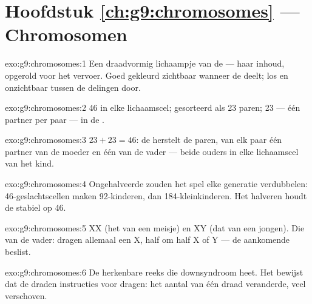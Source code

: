 \section*{Hoofdstuk \ref{ch:g9:chromosomes} --- Chromosomen}

\begin{solution}{exo:g9:chromosomes:1}
Een draadvormig lichaampje van de  --- haar inhoud,
opgerold voor het vervoer. Goed gekleurd zichtbaar wanneer de
 deelt; los en onzichtbaar tussen de delingen door.
\end{solution}

\begin{solution}{exo:g9:chromosomes:2}
46 in elke lichaamscel; gesorteerd als 23 paren; 23 --- één
partner per paar --- in de .
\end{solution}

\begin{solution}{exo:g9:chromosomes:3}
$23 + 23 = 46$: de  herstelt de paren, van elk paar
één partner van de moeder en één van de vader --- beide ouders
in elke lichaamscel van het kind.
\end{solution}

\begin{solution}{exo:g9:chromosomes:4}
Ongehalveerde  zouden het spel elke generatie
verdubbelen: 46-geslachtscellen maken 92-kinderen, dan
184-kleinkinderen. Het halveren houdt de  stabiel op 46.
\end{solution}

\begin{solution}{exo:g9:chromosomes:5}
XX (het  van een meisje) en XY (dat van een jongen).
Die van de vader:  dragen allemaal een X, 
half om half X of Y --- de aankomende  beslist.
\end{solution}

\begin{solution}{exo:g9:chromosomes:6}
De herkenbare reeks  die downsyndroom heet. Het bewijst
dat de draden instructies voor  dragen: het aantal van
één draad veranderde, veel  verschoven.
\end{solution}

